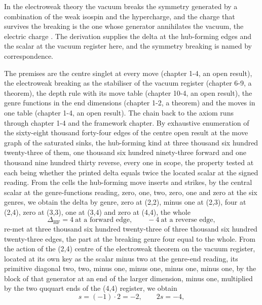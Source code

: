 \begin{chbridge}
In the electroweak theory the vacuum breaks the symmetry generated by a combination of the weak isospin and the hypercharge, and the charge that survives the breaking is the one whose generator annihilates the vacuum, the electric charge \cite{Weinberg1967,Higgs1964}. The derivation supplies the delta at the hub-forming edges and the scalar at the vacuum register here, and the symmetry breaking is named by correspondence.
\end{chbridge}
\begin{chproof}
The premises are the centre singlet at every move (chapter 1-4, an open result), the electroweak breaking as the stabiliser of the vacuum register (chapter 6-9, a theorem), the depth rule with its move table (chapter 10-4, an open result), the genre functions in the end dimensions (chapter 1-2, a theorem) and the moves in one table (chapter 1-4, an open result). The chain back to the axiom runs through chapter 1-4 and the framework chapter. By exhaustive enumeration of the sixty-eight thousand forty-four edges of the centre open result at the move graph of the saturated sinks, the hub-forming kind at three thousand six hundred twenty-three of them, one thousand six hundred ninety-three forward and one thousand nine hundred thirty reverse, every one in scope, the property tested at each being whether the printed delta equals twice the located scalar at the signed reading. From the cells the hub-forming move inserts and strikes, by the central scalar at the genre-functions reading, zero, one, two, zero, one and zero at the six genres, we obtain the delta by genre, zero at (2,2), minus one at (2,3), four at (2,4), zero at (3,3), one at (3,4) and zero at (4,4), the whole
\begin{equation}
\Delta_{\mathrm{HF}} = 4 \ \text{at a forward edge} , \qquad -4 \ \text{at a reverse edge} ,
\end{equation}
re-met at three thousand six hundred twenty-three of three thousand six hundred twenty-three edges, the part at the breaking genre four equal to the whole. From the action of the (2,4) centre of the electroweak theorem on the vacuum register, located at its own key as the scalar minus two at the genre-end reading, its primitive diagonal two, two, minus one, minus one, minus one, minus one, by the block of that generator at an end of the larger dimension, minus one, multiplied by the two ququart ends of the (4,4) register, we obtain
\begin{equation}
s = (-1)\cdot 2 = -2 , \qquad 2s = -4 ,

\end{equation}
\end{chproof}
